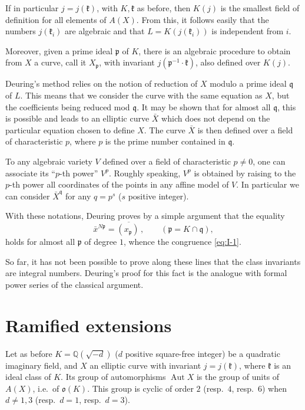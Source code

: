 If in particular $j=j(\mathfrak{k})$, with $K,\mathfrak{k}$ as before,
then $K(j)$ is the smallest field of definition for all elements of
$A(X)$. From this, it follows easily that the numbers $j(\mathfrak{k}_{i})$
are algebraic and that $L=K(j(\mathfrak{k}_{i}))$ is independent from
$i$.

Moreover, given a prime ideal $\mathfrak{p}$ of $K$, there is an
algebraic procedure to obtain from $X$ a curve, call it $X_{\mathfrak{p}}$,
with invariant $j(\mathfrak{p}^{-1}\cdot\mathfrak{k})$, also defined over
$K(j)$.

Deuring's method relies on the notion of reduction of $X$ modulo a prime
ideal $\mathfrak{q}$ of $L$. This means that we consider the curve with
the same equation as $X$, but the coefficients being reduced mod
$\mathfrak{q}$. It may be shown that for almost all $\mathfrak{q}$, this
is possible and leads to an elliptic curve $\bar{X}$ which does not depend
on the particular equation chosen to define $X$. The curve $\bar{X}$ is
then defined over a field of characteristic $p$, where $p$ is the prime
number contained in $\mathfrak{q}$.

To any algebraic variety $V$ defined over a field of characteristic
$p\neq 0$, one can associate its ``$p$-th power'' $V^{p}$. Roughly
speaking, $V^{p}$ is obtained by raising to the $p$-th power all
coordinates of the points in any affine model of $V$. In particular we can
consider $\bar{X}^{\mathfrak{q}}$ for any $q=p^{s}$ ($s$ positive integer).

With these notations, Deuring proves by a simple argument that the equality
\[
\bar{x}^{N\mathfrak{p}}=\overline{(x_{\mathfrak{p}})\,},\qquad
(\mathfrak{p}=K\cap\mathfrak{q}),
\tag{3}\label{eq:I-3}
\]
holds for almost all $\mathfrak{p}$ of degree $1$, whence the congruence
\eqref{eq:I-1}.

So far, it has not been possible to prove along these lines that the
class invariants are integral numbers. Deuring's proof for this fact is
the analogue with formal power series of the classical argument.

\section{Ramified extensions}\label{sec:I-ramified}

Let as before $K=\mathbb{Q}(\sqrt{-d})$ ($d$ positive square-free
integer) be a quadratic imaginary field, and $X$ an elliptic curve with
invariant $j=j(\mathfrak{k})$, where $\mathfrak{k}$ is an ideal class of
$K$. Its group of automorphisms $\operatorname{Aut} X$ is the group of
units of $A(X)$, i.e.\ of $\mathfrak{o}(K)$. This group is cyclic of
order $2$ (resp.\ $4$, resp.\ $6$) when $d\neq 1,3$ (resp.\ $d=1$,
resp.\ $d=3$).


